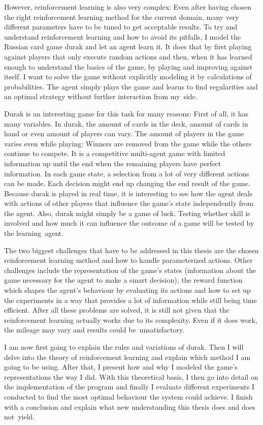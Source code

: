 \documentclass[a4paper,titlepage]{article}
\begin{document}
However, reinforcement learning is also very complex: Even after having chosen the right reinforcement learning method for the current domain, many very different parameters have to be tuned to get acceptable results. To try and understand reinforcement learning and how to avoid its pitfalls, I model the Russian card game durak and let an agent learn it. It does that by first playing against players that only execute random actions and then, when it has learned enough to understand the basics of the game, by playing and improving against itself. I want to solve the game without explicitly modeling it by calculations of probabilities. The agent simply plays the game and learns to find regularities and an optimal strategy without further interaction from my~side.

Durak is an interesting game for this task for many reasons: First of all, it has many variables. In durak, the amount of cards in the deck, amount of cards in hand or even amount of players can vary. The amount of players in the game varies even while playing: Winners are removed from the game while the others continue to compete. It is a competitive multi-agent game with limited information up until the end when the remaining players have perfect information. In each game state, a selection from a lot of very different actions can be made. Each decision might end up changing the end result of the game.
Because durak is played in real time, it is interesting to see how the agent deals with actions of other players that influence the game's state independently from the agent.
Also, durak might simply be a game of luck. Testing whether skill is involved and how much it can influence the outcome of a game will be tested by the learning~agent. \medskip

The two biggest challenges that have to be addressed in this thesis are the chosen reinforcement learning method and how to handle parameterized actions. Other challenges include the representation of the game's states (information about the game necessary for the agent to make a smart decision), the reward function which shapes the agent's behaviour by evaluating its actions and how to set up the experiments in a way that provides a lot of information while still being time efficient. After all these problems are solved, it is still not given that the reinforcement learning actually works due to its complexity. Even if it does work, the mileage may vary and results could be~unsatisfactory. \medskip

I am now first going to explain the rules and variations of durak. Then I will delve into the theory of reinforcement learning and explain which method I am going to be using. After that, I present how and why I modeled the game's representations the way I did. With this theoretical basis, I then go into detail on the implementation of the program and finally I evaluate different experiments I conducted to find the most optimal behaviour the system could achieve. I finish with a conclusion and explain what new understanding this thesis does and does not~yield.
\end{document}
